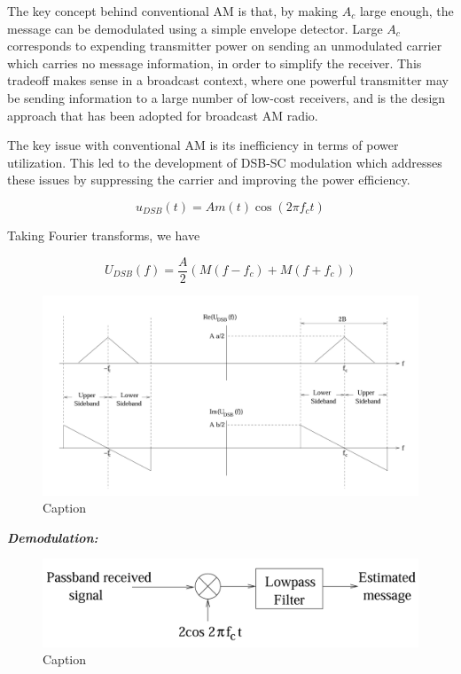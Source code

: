 \documentclass[conference]{IEEEtran}
\begin{document}
The key concept behind conventional AM is that, by making \( A_c \) large enough, the message can be demodulated using a simple envelope detector. Large \( A_c \) corresponds to expending transmitter power on sending an unmodulated carrier which carries no message information, in order to simplify the receiver. This tradeoff makes sense in a broadcast context, where one powerful transmitter may be sending information to a large number of low-cost receivers, and is the design approach that has been adopted for broadcast AM radio. 

The key issue with conventional AM is its inefficiency in terms of power utilization. This led to the development of DSB-SC modulation which addresses these issues by suppressing the carrier and improving the power efficiency. 

  \[  u_{DSB}(t) = A m(t) \cos(2\pi f_c t) \]


Taking Fourier transforms, we have

   \[ U_{DSB}(f) = \frac{A}{2} \left( M(f - f_c) + M(f + f_c) \right) \]

   \begin{figure}
       \centering
       \includegraphics[width=1\linewidth]{DSB_SC_Passband_Spectrum.png}
       \caption{Caption}
   \end{figure}

\textbf{\textit{Demodulation: }}
\begin{figure}
    \centering
    \includegraphics[width=1\linewidth]{Coherent_demodulation_AM.png}
    \caption{Caption}
\end{figure}
\end{document}
